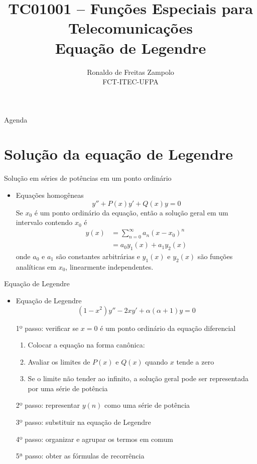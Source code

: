 \documentclass[
size=17pt,
paper=smartboard,
mode=present,
display=slidesnotes,
style=paintings,
nopagebreaks,
blackslide,
fleqn]{powerdot}
\title{\Large TC01001 -- Funções Especiais para Telecomunicações\\ \vspace{1cm}Equação de Legendre}
\author{Ronaldo de Freitas Zampolo\\FCT-ITEC-UFPA}
\date{ }
\begin{document}
   \maketitle[randomdots={false}]
   \begin{slide}{Agenda}
      \tableofcontents[content=sections]
   \end{slide}

   \section[ slide = true]{Solução da equação de Legendre}
      \begin{slide}[toc=]{Solução em séries de potências em um ponto ordinário}
         \begin{itemize}
            \item Equações homogêneas
		    \begin{equation}
			    y''+P(x)y' + Q(x)y = 0
		    \end{equation}
			 Se $x_0$ é um ponto ordinário da equação, então a solução geral em um intervalo contendo $x_0$ é
		    \begin{align}
			    y(x) &= \sum_{n=0}^\infty a_n(x-x_0)^n\\
				 &= a_0y_1(x) + a_1 y_2(x)
		    \end{align}
		    onde $a_0$ e $a_1$ são constantes arbitrárias e $y_1(x)$ e $y_2(x)$ são funções analíticas em $x_0$, linearmente independentes.
         \end{itemize}
      \end{slide}
      
      \begin{slide}[toc=]{Equação de Legendre}
         \begin{itemize}
            \item Equação de Legendre
		    \begin{equation}
			    (1-x^2)y''- 2xy' + \alpha(\alpha+1)y = 0
		    \end{equation}
	    \item[1º] passo: verificar se $x=0$ é um ponto ordinário da equação diferencial
		    \begin{enumerate}
			    \item Colocar a equação na forma canônica:
			    \item Avaliar os limites de $P(x)$ e $Q(x)$ quando $x$ tende a zero
		            \item Se o limite não tender ao infinito, a solução geral pode ser representada por uma série de potência
		    \end{enumerate}
	    \item[2º] passo: representar $y(n)$ como uma série de potência
	    \item[3º] passo: substituir na equação de Legendre
	    \item[4º] passo: organizar e agrupar os termos em comum
	    \item[5ª] passo: obter as fórmulas de recorrência
         \end{itemize}         
      \end{slide}
      
\end{document}
